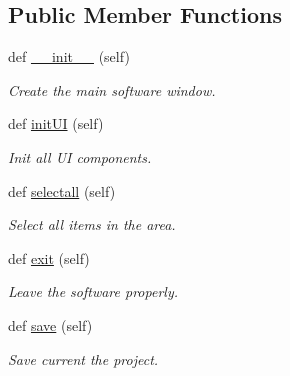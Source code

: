\subsection*{Public Member Functions}
\begin{DoxyCompactItemize}
\item 
\mbox{\label{classInterface_1_1Window_a30634a0810e5e6c1d11c26eb8896472f}} 
def \mbox{\hyperlink{classInterface_1_1Window_a30634a0810e5e6c1d11c26eb8896472f}{\+\_\+\+\_\+init\+\_\+\+\_\+}} (self)
\begin{DoxyCompactList}\small\item\em Create the main software window. \end{DoxyCompactList}\item 
\mbox{\label{classInterface_1_1Window_ae3a0701b8debf45bf553991705c61774}} 
def \mbox{\hyperlink{classInterface_1_1Window_ae3a0701b8debf45bf553991705c61774}{init\+UI}} (self)
\begin{DoxyCompactList}\small\item\em Init all UI components. \end{DoxyCompactList}\item 
\mbox{\label{classInterface_1_1Window_a6583627802d35bb64aa43cca7f567fff}} 
def \mbox{\hyperlink{classInterface_1_1Window_a6583627802d35bb64aa43cca7f567fff}{selectall}} (self)
\begin{DoxyCompactList}\small\item\em Select all items in the area. \end{DoxyCompactList}\item 
\mbox{\label{classInterface_1_1Window_ac894d93bf2e0b658975ad9411b3ba9c8}} 
def \mbox{\hyperlink{classInterface_1_1Window_ac894d93bf2e0b658975ad9411b3ba9c8}{exit}} (self)
\begin{DoxyCompactList}\small\item\em Leave the software properly. \end{DoxyCompactList}\item 
\mbox{\label{classInterface_1_1Window_ac47e0861043b96f48e225a5fdbb96d63}} 
def \mbox{\hyperlink{classInterface_1_1Window_ac47e0861043b96f48e225a5fdbb96d63}{save}} (self)
\begin{DoxyCompactList}\small\item\em Save current the project. \end{DoxyCompactList}\item 

\end{DoxyCompactItemize}
